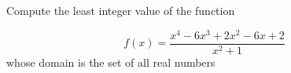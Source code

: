 Compute the least integer value of the function

\[f(x)=\dfrac{x^4-6x^3+2x^2-6x+2}{x^2+1}\]whose domain is the set of all real numbers

